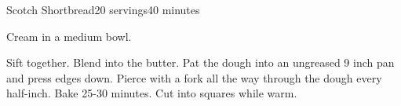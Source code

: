 \documentclass[../Cookbook.tex]{subfiles}
\begin{document}
\begin{recipe}[ScotchShortbread]{Scotch Shortbread}{20 servings}{40 minutes}

    Cream in a medium bowl.

    Sift together.
    Blend into the butter.
    Pat the dough into an ungreased 9 inch pan and press edges down.
    Pierce with a fork all the way through the dough every half-inch.
    Bake 25-30 minutes.
    Cut into squares while warm.
\end{recipe}
\end{document}
